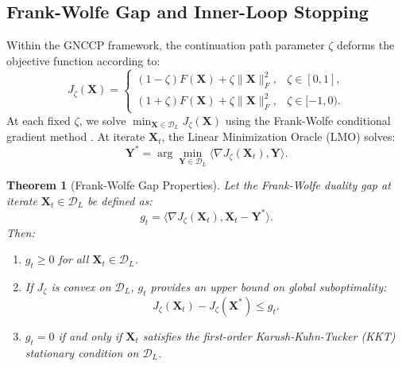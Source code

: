 \documentclass[conference]{IEEEtran}
\newtheorem{theorem}{Theorem}
\begin{document}
\subsection{Frank-Wolfe Gap and Inner-Loop Stopping}

Within the GNCCP framework, the continuation path parameter $\zeta$ deforms the objective function according to:
\begin{equation}
J_\zeta(\mathbf{X}) = \begin{cases}
(1 - \zeta)F(\mathbf{X}) + \zeta\|\mathbf{X}\|_F^2, & \zeta \in [0, 1], \\
(1 + \zeta)F(\mathbf{X}) + \zeta\|\mathbf{X}\|_F^2, & \zeta \in [-1, 0).
\end{cases}
\label{eq:Jzeta_def}
\end{equation}
At each fixed $\zeta$, we solve $\min_{\mathbf{X} \in \mathcal{D}_L} J_\zeta(\mathbf{X})$ using the Frank-Wolfe conditional gradient method \cite{frank1956algorithm, jaggi2013revisiting}. At iterate $\mathbf{X}_t$, the Linear Minimization Oracle (LMO) solves:
\begin{equation}
\mathbf{Y}^* = \arg\min_{\mathbf{Y} \in \mathcal{D}_L} \big\langle \nabla J_\zeta(\mathbf{X}_t), \mathbf{Y} \big\rangle.
\label{eq:lmo_def}
\end{equation}

\begin{theorem}[Frank-Wolfe Gap Properties]
\label{thm:duality_gap}
Let the Frank-Wolfe duality gap at iterate $\mathbf{X}_t \in \mathcal{D}_L$ be defined as:
\begin{equation}
g_t = \big\langle \nabla J_\zeta(\mathbf{X}_t), \mathbf{X}_t - \mathbf{Y}^* \big\rangle.
\label{eq:gt_def}
\end{equation}
Then:
\begin{enumerate}
    \item $g_t \geq 0$ for all $\mathbf{X}_t \in \mathcal{D}_L$.
    \item If $J_\zeta$ is convex on $\mathcal{D}_L$, $g_t$ provides an upper bound on global suboptimality:
    \begin{equation}
    J_\zeta(\mathbf{X}_t) - J_\zeta(\mathbf{X}^*) \leq g_t.
    \end{equation}
    \item $g_t = 0$ if and only if $\mathbf{X}_t$ satisfies the first-order Karush-Kuhn-Tucker (KKT) stationary condition on $\mathcal{D}_L$.
\end{enumerate}
\end{theorem}
\end{document}
